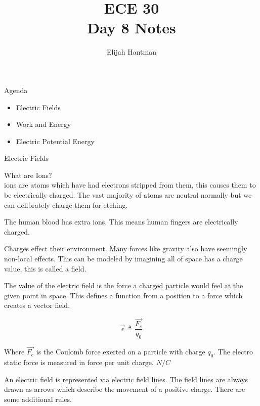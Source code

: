 \documentclass{report}
\title{\Huge{ECE 30}\\Day 8 Notes}
\author{\huge{Elijah Hantman}}
\date{}
\begin{document}
\maketitle
\newpage

\begin{description}
    \item {\large Agenda} 
        \begin{itemize}
            \item Electric Fields
            \item Work and Energy
            \item Electric Potential Energy
        \end{itemize}
    \item {\large Electric Fields}
        \begin{mdframed}
            What are Ions?\\
            ions are atoms which have had electrons stripped
            from them, this causes them to be electrically
            charged. The vast majority of atoms are neutral
            normally but we can delibrately charge them for
            etching.

            The human blood has extra ions. This means human
            fingers are electrically charged.
        \end{mdframed}
        \begin{mdframed}
            Charges effect their environment. Many forces like
            gravity also have seemingly non-local effects. This
            can be modeled by imagining all of space has a charge
            value, this is called a field.
        \end{mdframed}
        \begin{mdframed}
            The value of the electric field is the force a charged
            particle would feel at the given point in space. This
            defines a function from a position to a force which
            creates a vector field.

            \begin{displaymath}
                \vec{\epsilon} \triangleq \frac{\vec{F_e}}{q_0}
            \end{displaymath}

            Where $\vec{F_e}$ is the Coulomb force exerted on
            a particle with charge $q_0$.
            The electro static force is measured in force
            per unit charge. $\si{N/C}$
        \end{mdframed}
        \begin{mdframed}
            An electric field is represented via electric field
            lines. The field lines are always drawn as arrows which
            describe the movement of a positive charge. There are
            some additional rules.


\end{mdframed}
\end{description}
\end{document}
